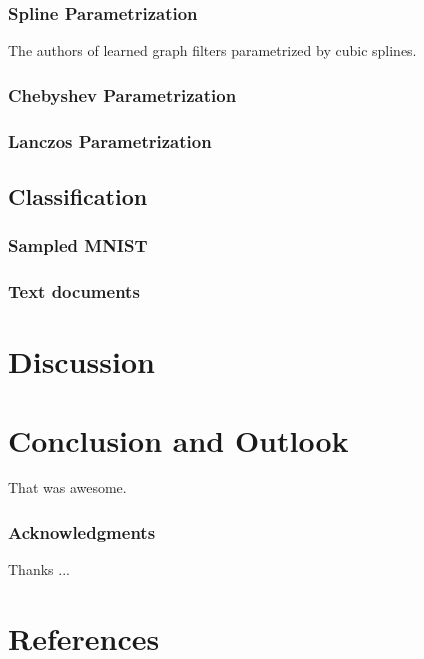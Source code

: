 \documentclass{article}
\begin{document}
\subsubsection{Spline Parametrization}\label{spline-parametrization}

The authors of \citep{bruna_spectral_2013, henaff_deep_2015} learned
graph filters parametrized by cubic splines.

\subsubsection{Chebyshev
Parametrization}\label{chebyshev-parametrization-1}

\subsubsection{Lanczos Parametrization}\label{lanczos-parametrization-1}

\subsection{Classification}\label{classification-1}

\subsubsection{Sampled MNIST}\label{sampled-mnist}

\subsubsection{Text documents}\label{text-documents}

\section{Discussion}\label{discussion}

\section{Conclusion and Outlook}\label{conclusion-and-outlook}

That was awesome.

\subsubsection*{Acknowledgments}

Thanks ...

\section*{References}
\end{document}
